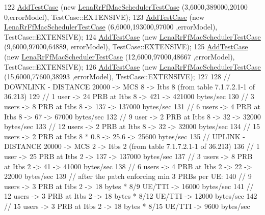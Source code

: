 \begin{DoxyCode}
122   \hyperlink{classns3_1_1TestCase_a3718088e3eefd5d6454569d2e0ddd835}{AddTestCase} (\textcolor{keyword}{new} \hyperlink{classLenaRrFfMacSchedulerTestCase}{LenaRrFfMacSchedulerTestCase} (3,6000,389000,20100
      0,errorModel), TestCase::EXTENSIVE);
123   \hyperlink{classns3_1_1TestCase_a3718088e3eefd5d6454569d2e0ddd835}{AddTestCase} (\textcolor{keyword}{new} \hyperlink{classLenaRrFfMacSchedulerTestCase}{LenaRrFfMacSchedulerTestCase} (6,6000,193000,97000
      ,errorModel), TestCase::EXTENSIVE);
124   \hyperlink{classns3_1_1TestCase_a3718088e3eefd5d6454569d2e0ddd835}{AddTestCase} (\textcolor{keyword}{new} \hyperlink{classLenaRrFfMacSchedulerTestCase}{LenaRrFfMacSchedulerTestCase} (9,6000,97000,64889,
      errorModel), TestCase::EXTENSIVE);
125   \hyperlink{classns3_1_1TestCase_a3718088e3eefd5d6454569d2e0ddd835}{AddTestCase} (\textcolor{keyword}{new} \hyperlink{classLenaRrFfMacSchedulerTestCase}{LenaRrFfMacSchedulerTestCase} (12,6000,97000,48667
      ,errorModel), TestCase::EXTENSIVE);
126   \hyperlink{classns3_1_1TestCase_a3718088e3eefd5d6454569d2e0ddd835}{AddTestCase} (\textcolor{keyword}{new} \hyperlink{classLenaRrFfMacSchedulerTestCase}{LenaRrFfMacSchedulerTestCase} (15,6000,77600,38993
      ,errorModel), TestCase::EXTENSIVE);
127 
128   \textcolor{comment}{// DOWNLINK - DISTANCE 20000 -> MCS 8 -> Itbs 8 (from table 7.1.7.2.1-1 of 36.213)}
129   \textcolor{comment}{// 1 user -> 24 PRB at Itbs 8 -> 421 -> 421000 bytes/sec}
130   \textcolor{comment}{// 3 users -> 8 PRB at Itbs 8 -> 137 -> 137000 bytes/sec}
131   \textcolor{comment}{// 6 users -> 4 PRB at Itbs 8 -> 67 -> 67000 bytes/sec}
132   \textcolor{comment}{// 9 user -> 2 PRB at Itbs 8 -> 32 -> 32000 bytes/sec}
133   \textcolor{comment}{// 12 users -> 2 PRB at Itbs 8 -> 32 -> 32000 bytes/sec}
134   \textcolor{comment}{// 15 users -> 2 PRB at Itbs 8 * 0.8 -> 25.6 -> 25600 bytes/sec}
135   \textcolor{comment}{// UPLINK - DISTANCE 20000 -> MCS 2 -> Itbs 2 (from table 7.1.7.2.1-1 of 36.213)}
136   \textcolor{comment}{// 1 user -> 25 PRB at Itbs 2 -> 137 -> 137000 bytes/sec}
137   \textcolor{comment}{// 3 users -> 8 PRB at Itbs 2 -> 41 -> 41000 bytes/sec}
138   \textcolor{comment}{// 6 users -> 4 PRB at Itbs 2 -> 22 -> 22000 bytes/sec}
139   \textcolor{comment}{// after the patch enforcing min 3 PRBs per UE:}
140   \textcolor{comment}{// 9 users -> 3 PRB at Itbs 2 -> 18 bytes * 8/9 UE/TTI -> 16000 bytes/sec}
141   \textcolor{comment}{// 12 users -> 3 PRB at Itbs 2 -> 18 bytes * 8/12 UE/TTI -> 12000 bytes/sec}
142   \textcolor{comment}{// 15 users -> 3 PRB at Itbs 2 -> 18 bytes * 8/15 UE/TTI -> 9600 bytes/sec}

\end{DoxyCode}
